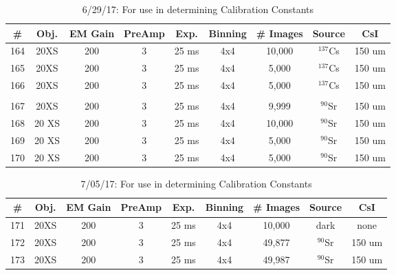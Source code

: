 \documentclass[12pt]{amsart}
\begin{document}
\begin{table}[!htbp]
	\centering
	\caption{6/29/17: For use in determining Calibration Constants}
	\label{tab:table29}
	\hspace*{-1cm}
	\begin{tabular}{ccccccccc}
	\toprule
	\# & Obj. & EM Gain & PreAmp & Exp. & Binning & \# Images & Source & CsI\\
	\midrule
	164 & 20XS & 200 & 3 & 25 ms & 4x4 & 10,000 & $^{137}$Cs & 150 um\\
	165 & 20XS & 200 & 3 & 25 ms & 4x4 & 5,000 & $^{137}$Cs & 150 um\\
	166 & 20XS & 200 & 3 & 25 ms & 4x4 & 5,000 & $^{137}$Cs & 150 um\\
	 & \\
	167 & 20XS & 200 & 3 & 25 ms & 4x4 & 9,999 & $^{90}$Sr & 150 um\\
	168 & 20 XS & 200 & 3 & 25 ms & 4x4 & 10,000 & $^{90}$Sr & 150 um\\
	169 & 20 XS & 200 & 3 & 25 ms & 4x4 & 5,000 & $^{90}$Sr & 150 um\\
	170 & 20 XS & 200 & 3 & 25 ms & 4x4 & 5,000 & $^{90}$Sr & 150 um\\
	\bottomrule
	\end{tabular}
	\hspace*{-1cm}
\end{table}

\begin{table}[!htbp]
	\centering
	\caption{7/05/17: For use in determining Calibration Constants}
	\label{tab:table30}
	\hspace*{-1cm}
	\begin{tabular}{ccccccccc}
	\toprule
	\# & Obj. & EM Gain & PreAmp & Exp. & Binning & \# Images & Source & CsI\\
	\midrule
	171 & 20XS & 200 & 3 & 25 ms & 4x4 & 10,000 & dark & none\\
	172 & 20XS & 200 & 3 & 25 ms & 4x4 & 49,877 & $^{90}$Sr & 150 um\\
	173 & 20XS & 200 & 3 & 25 ms & 4x4 & 49,987 & $^{90}$Sr & 150 um\\
	\end{tabular}
	\hspace*{-1cm}
\end{table}
\end{document}
